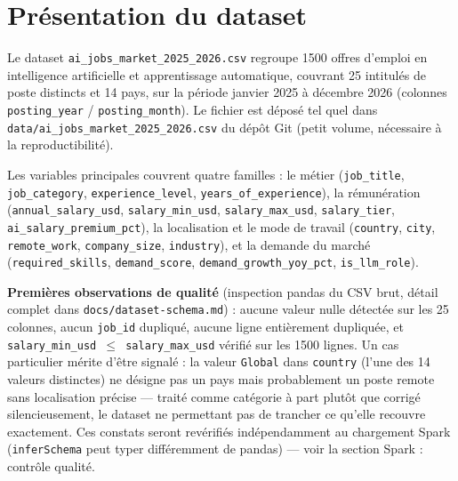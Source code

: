 \section{Présentation du dataset}

Le dataset \texttt{ai\_jobs\_market\_2025\_2026.csv} regroupe 1500 offres
d'emploi en intelligence artificielle et apprentissage automatique,
couvrant 25 intitulés de poste distincts et 14 pays, sur la période
janvier 2025 à décembre 2026 (colonnes \texttt{posting\_year} /
\texttt{posting\_month}). Le fichier est déposé tel quel dans
\texttt{data/ai\_jobs\_market\_2025\_2026.csv} du dépôt Git (petit volume,
nécessaire à la reproductibilité).

Les variables principales couvrent quatre familles : le métier
(\texttt{job\_title}, \texttt{job\_category}, \texttt{experience\_level},
\texttt{years\_of\_experience}), la rémunération
(\texttt{annual\_salary\_usd}, \texttt{salary\_min\_usd},
\texttt{salary\_max\_usd}, \texttt{salary\_tier},
\texttt{ai\_salary\_premium\_pct}), la localisation et le mode de travail
(\texttt{country}, \texttt{city}, \texttt{remote\_work},
\texttt{company\_size}, \texttt{industry}), et la demande du marché
(\texttt{required\_skills}, \texttt{demand\_score},
\texttt{demand\_growth\_yoy\_pct}, \texttt{is\_llm\_role}).

\textbf{Premières observations de qualité} (inspection pandas du CSV brut,
détail complet dans \texttt{docs/dataset-schema.md}) : aucune valeur
nulle détectée sur les 25 colonnes, aucun \texttt{job\_id} dupliqué,
aucune ligne entièrement dupliquée, et \texttt{salary\_min\_usd
$\le$ salary\_max\_usd} vérifié sur les 1500 lignes. Un cas particulier
mérite d'être signalé : la valeur \texttt{Global} dans \texttt{country}
(l'une des 14 valeurs distinctes) ne désigne pas un pays mais probablement
un poste remote sans localisation précise — traité comme catégorie à part
plutôt que corrigé silencieusement, le dataset ne permettant pas de
trancher ce qu'elle recouvre exactement. Ces constats seront revérifiés
indépendamment au chargement Spark (\texttt{inferSchema} peut typer
différemment de pandas) — voir la section Spark : contrôle qualité.

